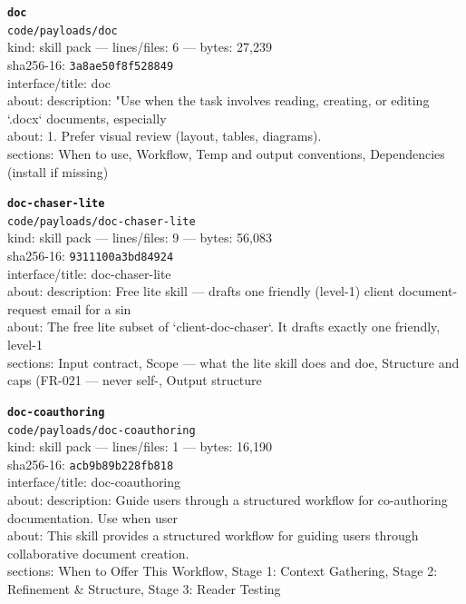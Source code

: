 \noindent\textbf{\texttt{doc}}\\
\texttt{code/payloads/doc}\\
kind: skill pack --- lines/files: 6 --- bytes: 27,239\\
sha256-16: \texttt{3a8ae50f8f528849}\\
interface/title: doc\\
about: description: "Use when the task involves reading, creating, or editing `.docx` documents, especially\\
about: 1. Prefer visual review (layout, tables, diagrams).\\
sections: When to use, Workflow, Temp and output conventions, Dependencies (install if missing)\\
\vspace*{6.0pt}

\noindent\textbf{\texttt{doc-chaser-lite}}\\
\texttt{code/payloads/doc-chaser-lite}\\
kind: skill pack --- lines/files: 9 --- bytes: 56,083\\
sha256-16: \texttt{9311100a3bd84924}\\
interface/title: doc-chaser-lite\\
about: description: Free lite skill — drafts one friendly (level-1) client document-request email for a sin\\
about: The free lite subset of `client-doc-chaser`. It drafts exactly one friendly, level-1\\
sections: Input contract, Scope — what the lite skill does and doe, Structure and caps (FR-021 — never self-, Output structure\\
\vspace*{6.0pt}

\noindent\textbf{\texttt{doc-coauthoring}}\\
\texttt{code/payloads/doc-coauthoring}\\
kind: skill pack --- lines/files: 1 --- bytes: 16,190\\
sha256-16: \texttt{acb9b89b228fb818}\\
interface/title: doc-coauthoring\\
about: description: Guide users through a structured workflow for co-authoring documentation. Use when user\\
about: This skill provides a structured workflow for guiding users through collaborative document creation.\\
sections: When to Offer This Workflow, Stage 1: Context Gathering, Stage 2: Refinement \& Structure, Stage 3: Reader Testing\\
\vspace*{6.0pt}
\newpage

